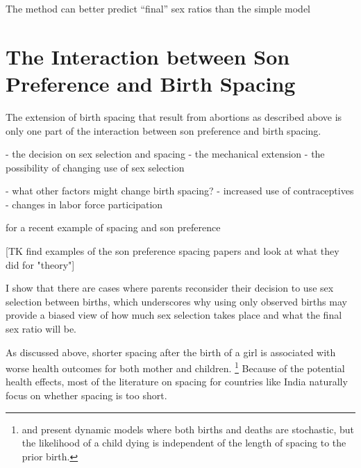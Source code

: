 \documentclass[12pt,letterpaper]{article}
\begin{document}
The method can better predict ``final'' sex ratios than the simple model



\section{The Interaction between Son Preference and Birth Spacing\label{sec:model}}

The extension of birth spacing that result from abortions as described above is 
only one part of the interaction between son preference and birth spacing.


- the decision on sex selection and spacing
    - the mechanical extension
    - the possibility of changing use of sex selection

- what other factors might change birth spacing?
    - increased use of contraceptives
    - changes in labor force participation
    



\citep{Soest2012} for a recent example of spacing and son preference



[TK find examples of the son preference spacing papers and look at what they did
for "theory"]

I show that there are cases where parents reconsider their decision to 
use sex selection between births, which underscores why 
using only observed births may provide a biased view of how much
sex selection takes place and what the final sex ratio will be.


As discussed above, shorter spacing after the birth of a girl is 
associated with worse health outcomes for both mother and children.%
\footnote{
\citet{wolpin84} and \citet{Newman1988} present dynamic models 
where both births and deaths are stochastic, but the likelihood of
a child dying is independent of the length of spacing to
the prior birth.
}
Because of the potential health effects, most of the literature on spacing 
for countries like India naturally focus on whether spacing is too short.
\end{document}
